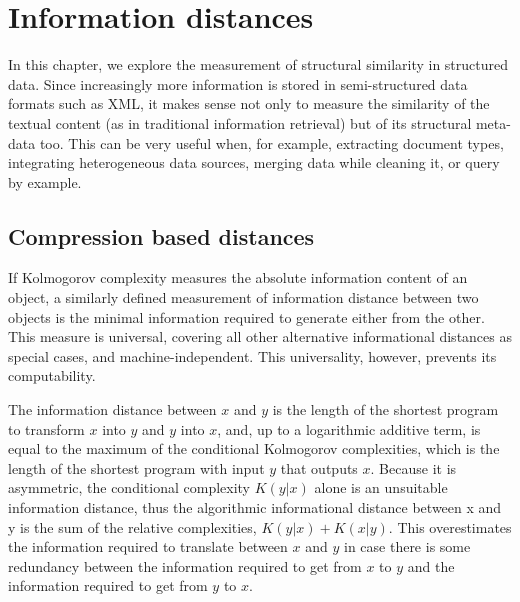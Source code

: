 \chapter{Information distances}\label{ch:sim_structured_data}
%
In this chapter, we explore the measurement of structural similarity in structured data.  Since increasingly more information is stored in semi-structured data formats such as XML, it makes sense not only to measure the similarity of the textual content (as in traditional information retrieval) but of its structural meta-data too. This can be very useful when, for example, extracting document types, integrating heterogeneous data sources, merging data while cleaning it, or query by example.
\section{Compression based distances}
If Kolmogorov complexity measures the absolute information content of an object, a similarly defined measurement of information distance between two objects is the minimal information required to generate either from the other.  This measure is universal, covering all other alternative informational distances as special cases, and machine-independent.  This universality, however, prevents its computability.\cite{}

The information distance between $x$ and $y$ is the length of the shortest program to transform $x$ into $y$ and $y$ into $x$, and, up to a logarithmic additive term, is equal to the maximum of the conditional Kolmogorov complexities, which is the length of the shortest program with input $y$ that outputs $x$\cite{}.  Because it is asymmetric, the conditional complexity $K(y|x)$ alone is an unsuitable information distance, thus the algorithmic informational distance between x and y is the sum of the relative complexities, $K(y|x)+ K(x|y)$. This overestimates the information required to translate between $x$ and $y$ in case there is some redundancy between the information required to get from $x$ to $y$ and the information required to get from $y$ to $x$.

